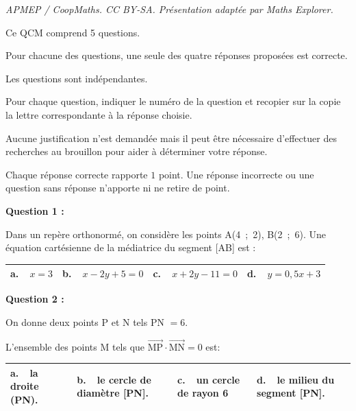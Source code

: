 \documentclass[10pt]{article}
\providecommand{\vect}[1]{\overrightarrow{#1}}
\begin{document}
\noindent\textit{APMEP / CoopMaths. CC BY-SA. Présentation adaptée par Maths Explorer.}\par\medskip
\medskip

Ce QCM comprend 5 questions.

Pour chacune des questions, une seule des quatre réponses proposées est correcte.

Les questions sont indépendantes.

Pour chaque question, indiquer le numéro de la question et recopier sur la copie la lettre correspondante à la réponse choisie.

Aucune justification n'est demandée mais il peut être nécessaire d'effectuer des recherches au brouillon pour aider à déterminer votre réponse.

Chaque réponse correcte rapporte $1$ point. Une réponse incorrecte ou une question sans réponse n'apporte ni ne retire de point.

\medskip

\textbf{Question 1 :}

\medskip

Dans un repère orthonormé, on considère les points A(4~;~2), B(2~;~6). Une équation cartésienne de la médiatrice du segment [AB] est :

\begin{center}
\begin{tabularx}{\linewidth}{|*{4}{X|}}\hline
\textbf{a.~~}$x = 3$&\textbf{b.~~}$x - 2y + 5 = 0$&\textbf{c.~~}$x + 2y - 11  = 0$&\textbf{d.~~}$y = 0,5x + 3$\\ \hline
\end{tabularx}
\end{center}

\medskip

\textbf{Question 2 :}

\medskip

On donne deux points P et N tels PN $= 6$.

L'ensemble des points M tels que $\vect{\text{MP}} \cdot \vect{\text{MN}} = 0$ est:

\begin{center}
\begin{tabularx}{\linewidth}{|*{4}{X|}}\hline
\textbf{a.~~}la droite (PN).&\textbf{b.~~}le cercle de diamètre [PN].&\textbf{c.~~}un cercle de rayon 6&\textbf{d.~~}le milieu du segment [PN].\\ \hline
\end{tabularx}
\end{center}
\end{document}
